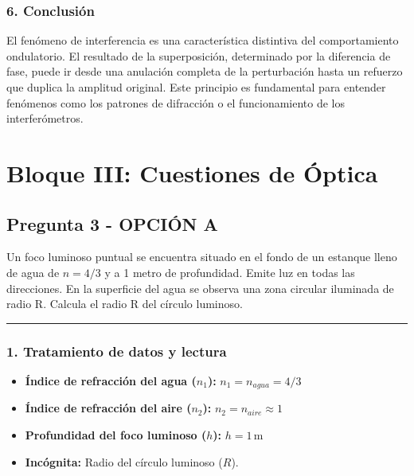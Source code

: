 \subsubsection*{6. Conclusión}
\begin{cajaconclusion}
El fenómeno de interferencia es una característica distintiva del comportamiento ondulatorio. El resultado de la superposición, determinado por la diferencia de fase, puede ir desde una anulación completa de la perturbación hasta un refuerzo que duplica la amplitud original. Este principio es fundamental para entender fenómenos como los patrones de difracción o el funcionamiento de los interferómetros.
\end{cajaconclusion}

\newpage

\section{Bloque III: Cuestiones de Óptica}
\label{sec:optica_2002_jun_ord}

\subsection{Pregunta 3 - OPCIÓN A}
\label{subsec:3A_2002_jun_ord}

\begin{cajaenunciado}
Un foco luminoso puntual se encuentra situado en el fondo de un estanque lleno de agua de $n=4/3$ y a 1 metro de profundidad. Emite luz en todas las direcciones. En la superficie del agua se observa una zona circular iluminada de radio R. Calcula el radio R del círculo luminoso.
\end{cajaenunciado}
\hrule

\subsubsection*{1. Tratamiento de datos y lectura}
\begin{itemize}
    \item \textbf{Índice de refracción del agua ($n_1$):} $n_1 = n_{agua} = 4/3$
    \item \textbf{Índice de refracción del aire ($n_2$):} $n_2 = n_{aire} \approx 1$
    \item \textbf{Profundidad del foco luminoso ($h$):} $h = 1 \, \text{m}$
    \item \textbf{Incógnita:} Radio del círculo luminoso ($R$).
\end{itemize}

